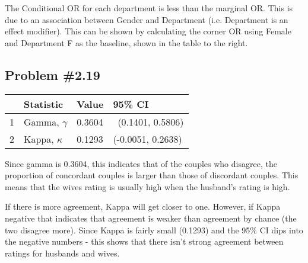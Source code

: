 \documentclass[12pt, letterpaper]{article}
\begin{document}
The Conditional OR for each department is less than the marginal OR.  This is due to an association between Gender and Department (i.e. Department is an effect modifier).  This can be shown by calculating the corner OR using Female and Department F as the baseline, shown in the table to the right.  



\subsection*{Problem {\#}2.19}  
\begin{table}[ht]
	\centering
	\begin{tabular}{rlll}
		\hline
		& Statistic & Value & 95\% CI\\ 
		\hline
		1 & Gamma, $\gamma$ & 0.3604 &\ (0.1401, 0.5806)\\ 
		2 & Kappa, $\kappa$ & 0.1293 & (-0.0051, 0.2638)\\ 
		\hline
	\end{tabular}
\end{table}

Since gamma is 0.3604, this indicates that of the couples who disagree, the proportion of concordant couples is larger than those of discordant couples.  This means that the wives rating is usually high when the husband's rating is high.

If there is more agreement, Kappa will get closer to one.  However, if Kappa negative that indicates that agreement is weaker than agreement by chance (the two disagree more).  Since Kappa is fairly small (0.1293) and the 95\% CI dips into the negative numbers - this shows that there isn't strong agreement between ratings for husbands and wives.  

\newpage  
\end{document}
